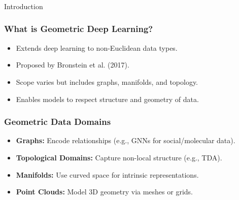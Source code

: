 \begin{frame}[fragile]\frametitle{}
\begin{center}
{\Large Introduction}
\end{center}
\end{frame}


\begin{frame}[fragile]\frametitle{What is Geometric Deep Learning?}
  \begin{itemize}
    \item Extends deep learning to non-Euclidean data types.
    \item Proposed by Bronstein et al. (2017).
    \item Scope varies but includes graphs, manifolds, and topology.
    \item Enables models to respect structure and geometry of data.
  \end{itemize}
\end{frame}

\begin{frame}[fragile]\frametitle{Geometric Data Domains}
  \begin{itemize}
    \item \textbf{Graphs:} Encode relationships (e.g., GNNs for social/molecular data).
    \item \textbf{Topological Domains:} Capture non-local structure (e.g., TDA).
    \item \textbf{Manifolds:} Use curved space for intrinsic representations.
    \item \textbf{Point Clouds:} Model 3D geometry via meshes or grids.
  \end{itemize}
\end{frame}


